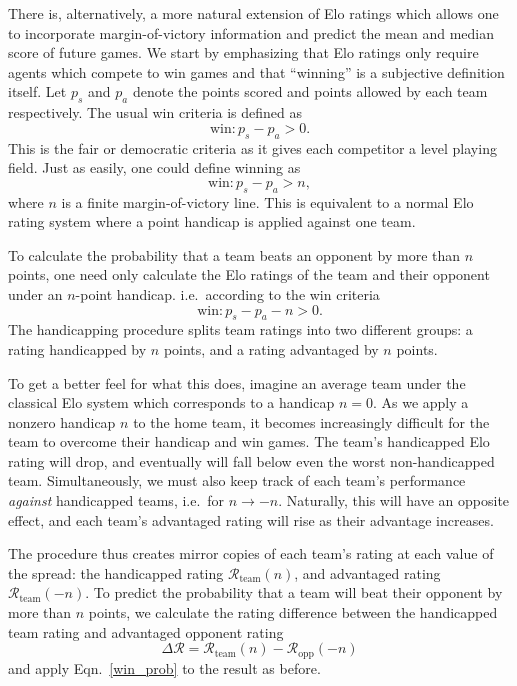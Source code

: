 \documentclass[aps,prc,reprint,amsmath,superscriptaddress,nofootinbib]{revtex4-1}
\newcommand{\R}{\mathcal{R}}
\begin{document}
There is, alternatively, a more natural extension of Elo ratings which allows one to incorporate margin-of-victory information and predict the mean and median score of future games.
We start by emphasizing that Elo ratings only require agents which compete to win games and that ``winning'' is a subjective definition itself.
Let $p_s$ and $p_a$ denote the points scored and points allowed by each team respectively.
The usual win criteria is defined as
\begin{equation}
  \text{win}: p_s - p_a > 0.
\end{equation}
This is the fair or democratic criteria as it gives each competitor a level playing field.
Just as easily, one could define winning as
\begin{equation}
  \text{win}: p_s - p_a > n,
\end{equation}
where $n$ is a finite margin-of-victory line.
This is equivalent to a normal Elo rating system where a point handicap is applied against one team.

To calculate the probability that a team beats an opponent by more than $n$ points, one need only calculate the Elo ratings of the team and their opponent under an $n$-point handicap. i.e.\ according to the win criteria
\begin{equation}
  \text{win}: p_s - p_a - n > 0.
\end{equation}
The handicapping procedure splits team ratings into two different groups: a rating handicapped by $n$ points, and a rating advantaged by $n$ points.

To get a better feel for what this does, imagine an average team under the classical Elo system which corresponds to a handicap $n=0$. 
As we apply a nonzero handicap $n$ to the home team, it becomes increasingly difficult for the team to overcome their handicap and win games.
The team's handicapped Elo rating will drop, and eventually will fall below even the worst non-handicapped team.
Simultaneously, we must also keep track of each team's performance \emph{against} handicapped teams, i.e.\ for $n \rightarrow -n$.
Naturally, this will have an opposite effect, and each team's advantaged rating will rise as their advantage increases.

The procedure thus creates mirror copies of each team's rating at each value of the spread: the handicapped rating $\R_\text{team}(n)$, and advantaged rating $\R_\text{team}(-n)$.
To predict the probability that a team will beat their opponent by more than $n$ points, we calculate the rating difference between the handicapped team rating and advantaged opponent rating
\begin{equation}
  \Delta\R = \R_\text{team}(n) - \R_\text{opp}(-n)
\end{equation}
and apply Eqn.~\eqref{win_prob} to the result as before.
\end{document}
